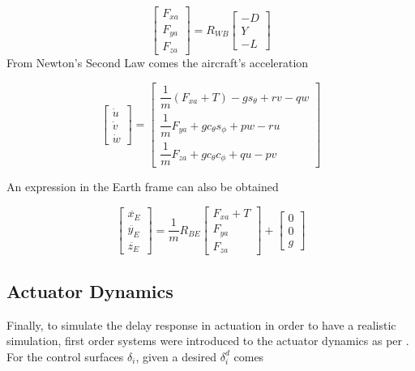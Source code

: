 \begin{equation}
\begin{bmatrix}
F_{xa}\\
F_{ya}\\
F_{za}
\end{bmatrix}
= R_{WB}
\begin{bmatrix}
-D\\
Y\\
-L
\end{bmatrix}
\label{eq:body_forces}
\end{equation}
From Newton's Second Law comes the aircraft's acceleration

\begin{equation}
\begin{bmatrix}
\dot{u}\\
\dot{v}\\
\dot{w}
\end{bmatrix}
=
\begin{bmatrix}
\dfrac{1}{m}(F_{xa} + T) - gs_\theta +rv-qw\\
\dfrac{1}{m}F_{ya} + gc_\theta s_\phi + pw - ru\\
\dfrac{1}{m}F_{za} + gc_\theta c_\phi + qu - pv
\end{bmatrix}
\label{eq:boddy_acc}
\end{equation}

An expression in the Earth frame can also be obtained

\begin{equation}
\begin{bmatrix}
\ddot{x_E}\\
\ddot{y_E}\\
\ddot{z_E}
\end{bmatrix}
= \dfrac{1}{m} R_{BE}
\begin{bmatrix}
F_{xa}+T\\
F_{ya}\\
F_{za}
\end{bmatrix}
+
\begin{bmatrix}
0\\
0\\
g
\end{bmatrix}
\end{equation}

\subsection{Actuator Dynamics}
\label{section:background/model/actuator_dynamics}

Finally, to simulate the delay response in actuation in order to have a realistic simulation, first order systems were introduced to the actuator dynamics as per \cite{hector}. For the control surfaces $\delta_i$, given a desired $\delta_i^d$ comes

